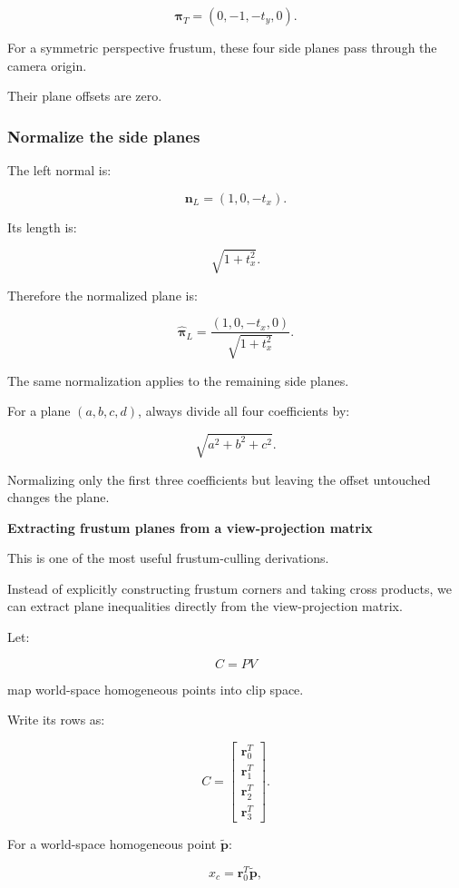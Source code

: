 \[
 \boxed{ \boldsymbol\pi_T=(0,-1,-t_y,0) }.
\]

For a symmetric perspective frustum, these four side planes pass through the camera origin.

Their plane offsets are zero.

\subsubsection{Normalize the side planes}\label{normalize-the-side-planes}

The left normal is:

\[
 \mathbf n_L=(1,0,-t_x).
\]

Its length is:

\[
 \sqrt{1+t_x^2}.
\]

Therefore the normalized plane is:

\[
 \boxed{ \hat{\boldsymbol\pi}_L= \frac{(1,0,-t_x,0)} {\sqrt{1+t_x^2}} }.
\]

The same normalization applies to the remaining side planes.

For a plane \((a,b,c,d)\), always divide all four coefficients by:

\[
 \sqrt{a^2+b^2+c^2}.
\]

Normalizing only the first three coefficients but leaving the offset untouched changes the plane.

\textbf{Extracting frustum planes from a view-projection matrix}

This is one of the most useful frustum-culling derivations.

Instead of explicitly constructing frustum corners and taking cross products, we can extract plane inequalities directly from the view-projection matrix.

Let:

\[
 \boxed{ C=PV }
\]

map world-space homogeneous points into clip space.

Write its rows as:

\[
 C= \begin{bmatrix} \mathbf r_0^T\\ \mathbf r_1^T\\ \mathbf r_2^T\\ \mathbf r_3^T \end{bmatrix}.
\]

For a world-space homogeneous point \(\tilde{\mathbf p}\):

\[
 x_c=\mathbf r_0^T\tilde{\mathbf p},
\]

